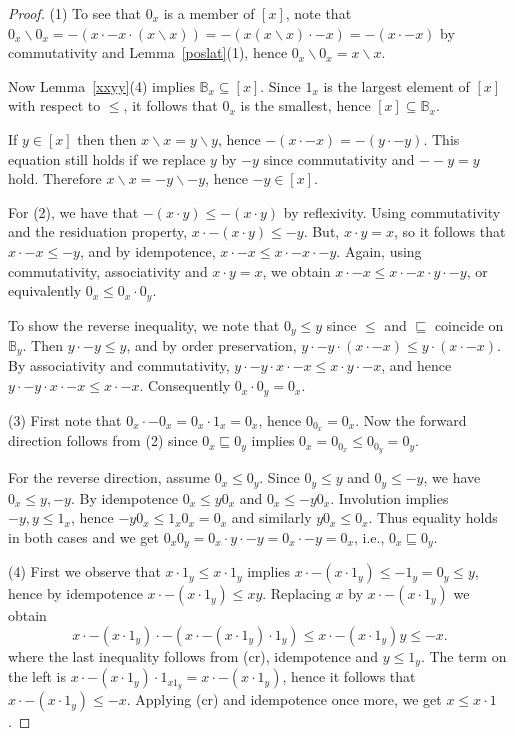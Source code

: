 \documentclass[12pt]{amsart}
\newcommand{\ld}{{\backslash}}
\begin{document}
\begin{proof}
(1) To see that $0_x$ is a member of $[x]$, note that $0_x\ld 0_x=-(x\cdot -x\cdot (x\ld x))=
-(x(x\ld x)\cdot -x)=-(x\cdot -x)$ by commutativity and Lemma~\ref{poslat}(1), hence
$0_x\ld 0_x=x\ld x$.

Now Lemma~\ref{xxyy}(4) implies $\mathbb B_x\subseteq [x]$. Since $1_x$ is the largest
element of $[x]$ with respect to $\le$, it follows that $0_x$ is the smallest, hence $[x]\subseteq \mathbb B_x$.

If $y\in [x]$ then
then $x\ld x=y\ld y$, hence $-(x\cdot -x)=-(y\cdot -y)$. This equation still holds if we replace $y$ by $-y$ since commutativity and $-{-}y=y$ hold. Therefore $x\ld x=-y\ld{-}y$, hence $-y\in [x]$.

For (2), we have that $-(x \cdot y) \le -(x \cdot y)$ by reflexivity. Using commutativity and the residuation property, $x \cdot - (x \cdot y) \le -y$. But, $x \cdot y = x$, so it follows that $x \cdot - x \le -y$, and by idempotence, $x \cdot -x \le x \cdot -x \cdot -y$. Again, using commutativity, associativity and $x \cdot y = x$, we obtain $x \cdot -x \le x \cdot -x \cdot y \cdot -y$, or equivalently $0_x \le 0_x \cdot 0_y$.

To show the reverse inequality, we note that $0_y \le y$ since $\le$ and $\sqsubseteq$ coincide on $\mathbb{B}_y$. Then $y \cdot - y \le y$, and by order preservation, $y\cdot -y \cdot (x\cdot -x) \le y \cdot (x \cdot -x)$. By associativity and commutativity, $y\cdot -y \cdot x \cdot -x \le x \cdot y \cdot -x$, and hence $y\cdot -y \cdot x \cdot -x \le x \cdot -x$. Consequently $0_x \cdot 0_y = 0_x$.

(3) First note that $0_x\cdot -0_x=0_x\cdot 1_x=0_x$, hence
$0_{0_x}=0_x$. Now the forward direction follows from (2) since $0_x\sqsubseteq 0_y$ implies $0_x=0_{0_x}\le 0_{0_y}=0_y$.

For the reverse direction, assume $0_x\le 0_y$.
Since $0_y\le y$ and $0_y\le -y$, we have $0_x\le y, -y$. By idempotence
$0_x\le y0_x$ and $0_x\le -y0_x$. Involution implies $-y,y\le 1_x$, hence
$-y0_x\le 1_x0_x=0_x$ and similarly $y0_x\le 0_x$. Thus equality holds in both cases and
we get $0_x0_y=0_x\cdot y\cdot-y=0_x\cdot -y=0_x$, i.e., $0_x\sqsubseteq 0_y$.

(4) First we observe that $x\cdot 1_y\le x\cdot 1_y$ implies $x\cdot -(x\cdot 1_y)\le -1_y=0_y\le y$,
hence by idempotence $x\cdot -(x\cdot 1_y)\le xy$. Replacing $x$ by $x\cdot-(x\cdot 1_y)$ we obtain
$$
x\cdot-(x\cdot 1_y)\cdot -(x\cdot-(x\cdot 1_y)\cdot 1_y)\le x\cdot-(x\cdot 1_y)y\le -x.
$$
where the last inequality follows from (cr), idempotence and $y\le 1_y$.
The term on the left is $x\cdot-(x\cdot 1_y)\cdot 1_{x1_y}=x\cdot-(x\cdot 1_y)$,
hence it follows that $x\cdot-(x\cdot 1_y)\le -x$. Applying (cr) and idempotence once more, we get $x\le x\cdot 1$.


\end{proof}
\end{document}
